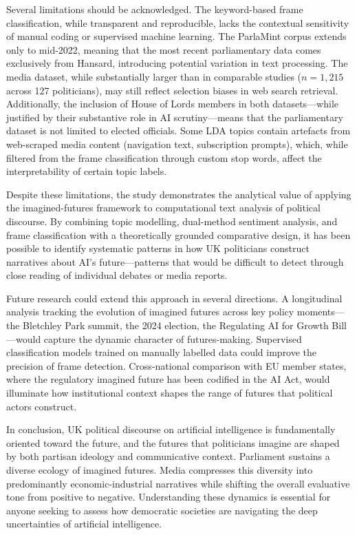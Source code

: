 Several limitations should be acknowledged. The keyword-based frame classification, while transparent and reproducible, lacks the contextual sensitivity of manual coding or supervised machine learning. The ParlaMint corpus extends only to mid-2022, meaning that the most recent parliamentary data comes exclusively from Hansard, introducing potential variation in text processing. The media dataset, while substantially larger than in comparable studies ($n=1{,}215$ across 127 politicians), may still reflect selection biases in web search retrieval. Additionally, the inclusion of House of Lords members in both datasets---while justified by their substantive role in AI scrutiny---means that the parliamentary dataset is not limited to elected officials. Some LDA topics contain artefacts from web-scraped media content (navigation text, subscription prompts), which, while filtered from the frame classification through custom stop words, affect the interpretability of certain topic labels.

Despite these limitations, the study demonstrates the analytical value of applying the imagined-futures framework to computational text analysis of political discourse. By combining topic modelling, dual-method sentiment analysis, and frame classification with a theoretically grounded comparative design, it has been possible to identify systematic patterns in how UK politicians construct narratives about AI's future---patterns that would be difficult to detect through close reading of individual debates or media reports.

Future research could extend this approach in several directions. A longitudinal analysis tracking the evolution of imagined futures across key policy moments---the Bletchley Park summit, the 2024 election, the Regulating AI for Growth Bill---would capture the dynamic character of futures-making. Supervised classification models trained on manually labelled data could improve the precision of frame detection. Cross-national comparison with EU member states, where the regulatory imagined future has been codified in the AI Act, would illuminate how institutional context shapes the range of futures that political actors construct.

In conclusion, UK political discourse on artificial intelligence is fundamentally oriented toward the future, and the futures that politicians imagine are shaped by both partisan ideology and communicative context. Parliament sustains a diverse ecology of imagined futures. Media compresses this diversity into predominantly economic-industrial narratives while shifting the overall evaluative tone from positive to negative. Understanding these dynamics is essential for anyone seeking to assess how democratic societies are navigating the deep uncertainties of artificial intelligence.
